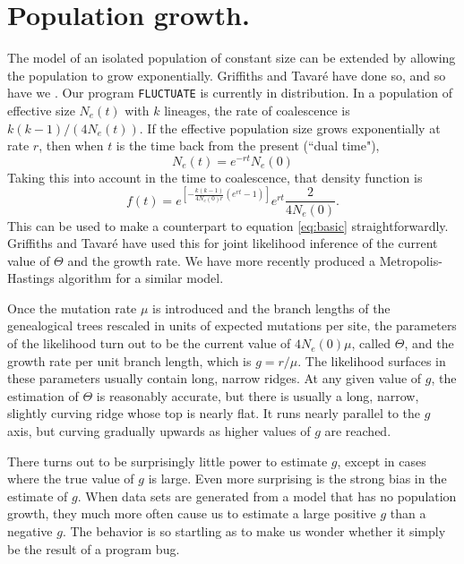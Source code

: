 \section{Population growth.}

The model of an isolated population of constant size can be extended by
allowing the population to grow exponentially.  Griffiths and Tavar\'e
\cite{GT94a}
have done so, and so have we \cite{Kuhner98}.  Our program {\tt FLUCTUATE} is currently
in distribution.  In a population of effective
size $N_e(t)$ with $k$ lineages, the
rate of coalescence is $k(k-1)/(4N_e(t))$.  If the effective
population size grows
exponentially at rate $r$, then when $t$ is the time back from the present
(``dual time"),
\begin{equation} %
N_e(t) = e^{-rt} N_e(0)
\end{equation}
Taking this into account in the time to coalescence, that density function
is \cite{Kuhner98}
\begin{equation} %
f(t) =  e^{\left[-\frac{k(k-1)}{4N_e(0)r}\left(e^{rt}-1\right)\right]} e^{rt} \frac{2}{4N_e(0)}.
\end{equation}
This can be used to make a counterpart to equation \ref{eq:basic} straightforwardly.
Griffiths and Tavar\'e \cite{GT94a} have used this for joint likelihood inference of
the current value of $\Theta$ and the growth rate.  We have more recently
produced a Metropolis-Hastings algorithm \cite{Kuhner98} for a similar model.

Once the mutation rate $\mu$ is introduced and the branch lengths of the
genealogical trees rescaled in units of expected mutations per site,
the parameters of the likelihood turn out to be the current value of
$4N_e(0)\mu$, called $\Theta$, and the growth rate per unit branch length,
which is $g = r/\mu$.  The likelihood surfaces in these parameters usually 
contain long, narrow ridges.  At any
given value of $g$, the estimation of $\Theta$ is reasonably accurate,
but there is usually a long, narrow, slightly curving ridge whose top is
nearly flat.  It runs nearly parallel to the $g$ axis, but curving
gradually upwards as higher values of $g$ are reached.

There turns out to be surprisingly little power to estimate
$g$, except in cases where the true value of $g$ is large.  Even more
surprising is
the strong bias in the estimate of $g$.  When data sets are generated from a
model that has no population growth, they much more often cause us to
estimate a large positive $g$ than a negative $g$.  The behavior is so
startling as to make us wonder whether it simply be the result of a program
bug.  


